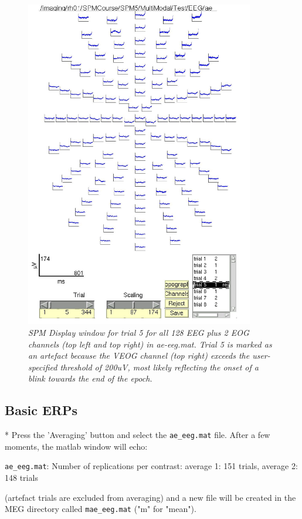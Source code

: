 \begin{figure}
\begin{center}
\includegraphics[width=100mm]{multimodal/figures/figure_32_2}
\caption{\em  SPM Display window for trial 5 for all 128 EEG plus 2 EOG channels (top left and top right) in ae-eeg.mat. Trial 5 is marked as an artefact because the VEOG channel (top right) exceeds the user-specified threshold of 200uV, most likely reflecting the onset of a blink towards the end of the epoch. \label{fig_32_2}}
\end{center}
\end{figure}



\subsection{Basic ERPs}

* Press the 'Averaging' button and select the \verb!ae_eeg.mat! file. After a few moments, the matlab window will echo:

    \verb!ae_eeg.mat!: Number of replications per contrast:
    average 1: 151 trials, average 2: 148 trials

    (artefact trials are excluded from averaging) and a new file will be created in     the MEG directory called \verb!mae_eeg.mat! ("m" for "mean").

